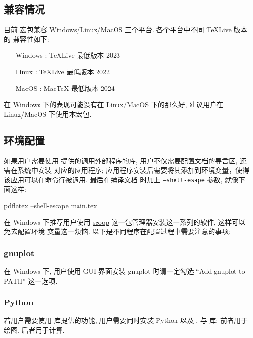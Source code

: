 \documentclass[
  hyper, lang=cn, 
  class=l3dox, 
]{../../zlatex/code/ztex}
\begin{document}
\subsection{兼容情况}
目前  宏包兼容 Windows/Linux/MacOS 三个平台. 各个平台中不同 \TeX{}Live 版本的
兼容性如下:

\hspace*{5cm}\parbox{\linewidth}{
\begin{itemize}
  \item [Windows] : \TeX{}Live 最低版本 2023
  \item [Linux] : \TeX{}Live 最低版本 2022
  \item [MacOS] : Mac\TeX{} 最低版本 2024
\end{itemize}}

\ztikz{} 在 Windows 下的表现可能没有在 Linux/MacOS 下的那么好, 建议用户在 Linux/MacOS 下使用本宏包.


\subsection{环境配置}
如果用户需要使用 \zTikZ{} 提供的调用外部程序的库, 用户不仅需要配置文档的导言区, 还需在系统中安装
对应的应用程序; 应用程序安装后需要将其添加到环境变量，使得该应用可以在命令行被调用. 最后在编译文档
时加上 \texttt{--shell-esape} 参数, 就像下面这样:
\def\exampleUR{}

\begin{DocExample}
  pdflatex --shell-escape main.tex
\end{DocExample}

在 Windows 下推荐用户使用 \href{https://scoop.sh/}{scoop} 这一包管理器安装这一系列的软件, 这样可以免去配置环境
变量这一烦恼. 以下是不同程序在配置过程中需要注意的事项:

\vspace*{-.5em}
\subsubsection{gnuplot}
在 Windows 下, 用户使用 GUI 界面安装 gnuplot 时请一定勾选 ``Add gnuplot to PATH'' 这一选项.

\vspace*{-.5em}
\subsubsection{Python}
若用户需要使用  库提供的功能, 用户需要同时安装 Python 以及 , 
 与  库; 前者用于绘图, 后者用于计算.
\end{document}
